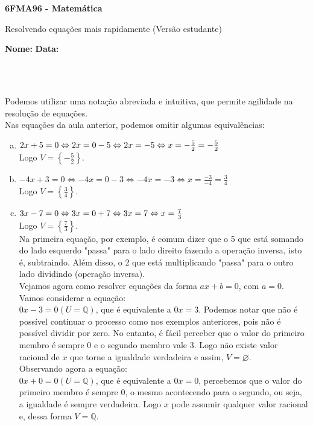 \documentclass[a4paper,14pt]{article}
\begin{document}
	
	\noindent\textbf{6FMA96 - Matemática} 
	
	\begin{center}Resolvendo equações mais rapidamente (Versão estudante)
	\end{center}
	
	\noindent\textbf{Nome:} \underline{\hspace{10cm}}
	\noindent\textbf{Data:} \underline{\hspace{4cm}}
	
	~ \\ ~
	\begin{multicols}{2}
		\noindent Podemos utilizar uma notação abreviada e intuitiva, que permite agilidade na resolução de equações. \\
		Nas equações da aula anterior, podemos omitir algumas equivalências:
		\begin{enumerate}[a)]
			\item $2x + 5 = 0 \Leftrightarrow 2x = 0 - 5 \Leftrightarrow \\ 2x = -5 \Leftrightarrow x = -\frac{5}{2} = -\frac{5}{2}$ \\
			Logo $V = \left\{-\frac{5}{2}\right\}$.
			\item $-4x + 3 = 0 \Leftrightarrow -4x = 0 - 3 \Leftrightarrow -4x = -3 \Leftrightarrow x = \frac{-3}{-4} = \frac{3}{4}$ \\
			Logo $V = \left\{\frac{3}{4}\right\}$.
			\item $3x - 7 = 0 \Leftrightarrow 3x = 0 + 7 \Leftrightarrow \\ 3x = 7 \Leftrightarrow x = \frac{7}{3}$ \\
			Logo $V = \left\{\frac{7}{3}\right\}$. \\
			Na primeira equação, por exemplo, é comum dizer que o 5 que está somando do lado esquerdo "passa" para o lado direito fazendo a operação inversa, isto é, subtraindo. Além disso, o 2 que está multiplicando "passa" para o outro lado dividindo (operação inversa). \\
			Vejamos agora como resolver equações da forma $ax + b = 0$, com $a = 0$. \\
			Vamos considerar a equação: \\ $0x - 3 = 0 (U = \mathbb{Q})$, que é equivalente a $0x = 3$. Podemos notar que não é possível continuar o processo como nos exemplos anteriores, pois não é possível dividir por zero. No entanto, é fácil perceber que o valor do primeiro membro é sempre 0 e o segundo membro vale 3. Logo não existe valor racional de $x$ que torne a igualdade verdadeira e assim, $V = \varnothing$. \\
			Observando agora a equação: \\ $0x + 0 = 0 (U = \mathbb{Q})$, que é equivalente a $0x = 0$, percebemos que o valor do primeiro membro é sempre 0, o mesmo acontecendo para o segundo, ou seja, a igualdade é sempre verdadeira. Logo $x$ pode assumir qualquer valor racional e, dessa forma $V = \mathbb{Q}$.
			\end{enumerate}
	\end{multicols}
\end{document}
